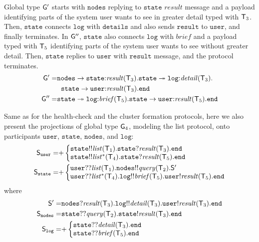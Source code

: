 Global type ${\sf G}'$ starts with $\mathtt{nodes}$ replying to $\mathtt{state}$ $\mathit{result}$ message and a payload identifying parts of the system user wants to see in greater detail typed with ${\mathsf T}_3$. Then, $\mathtt{state}$ connects $\mathtt{log}$ with $\mathtt{details}$ and also sends $\mathtt{result}$ to $\mathtt{user}$, and finally terminates. 
In ${\sf G}''$, $\mathtt{state}$ also connects $\mathtt{log}$ with $\mathit{brief}$ and a payload typed with ${\mathsf T}_5$ identifying parts of the system user wants to see without greater detail. Then, $\mathtt{state}$ replies to $\mathtt{user}$ with $\mathtt{result}$ message, and the protocol terminates.
\begin{align*}
{\sf G}' =  & 
\mathtt{nodes}\to\mathtt{state}{:}\mathit{result}({\mathsf T}_3).\mathtt{state}\twoheadrightarrow \mathtt{log}{:}\mathit{detail}({\mathsf T}_3). \\
& \hspace{2mm}
\mathtt{state}\to\mathtt{user}{:}\mathit{result}({\mathsf T}_3).\mathtt{end}\\
{\sf G}'' = &
\mathtt{state}\twoheadrightarrow \mathtt{log}{:}\mathit{brief}({\mathsf T}_5).\mathtt{state}\to\mathtt{user}{:}\mathit{result}({\mathsf T}_5).\mathtt{end}
\end{align*}

Same as for the health-check and the cluster formation protocols, here we also present the projections of global type ${\sf G}_4$, modeling the list protocol, onto participants $\mathtt{user}$, $\mathtt{state}$, $\mathtt{nodes}$, and $\mathtt{log}$:
\begin{align*}
\ST_\mathtt{user} =& 
{+}
\left\{
\begin{array}{@{}l@{}}  
\mathtt{state}{!!}\mathit{list}(\T_1).\mathtt{state}{?}\mathit{result}(\T_3).\tend \\
\mathtt{state}{!!}\mathit{list^*}(\T_4).\mathtt{state}{?}\mathit{result}(\T_5).\tend 
\end{array} \right. \\
%
%
\ST_\mathtt{state} =&
{+}
\left\{
\begin{array}{@{}l@{}}  
\mathtt{user}{??}\mathit{list}(\T_1).\mathtt{nodes}{!!}\mathit{query}(\T_2).\ST'\\
\mathtt{user}{??}\mathit{list^*}(\T_4).\mathtt{log}{!!}\mathit{brief}(\T_5).\mathtt{user}{!}\mathit{result}(\T_5).\tend
\end{array} \right. 
\end{align*}
where
\begin{align*}
%
\ST'  =& 
\mathtt{nodes}{?}\mathit{result}(\T_3).\mathtt{log}{!!}\mathit{detail}(\T_3).\mathtt{user}{!}\mathit{result}(\T_3).\tend\\
%
%
\ST_\mathtt{nodes} = &
\mathtt{state}{??}\mathit{query}(\T_2).\mathtt{state}{!}\mathit{result}(\T_3).\tend \\
%
%
\ST_\mathtt{log} = & 
{+}
\left\{
\begin{array}{@{}l@{}}  
\mathtt{state}{??}\mathit{detail}(\T_3).\tend \\
\mathtt{state}{??}\mathit{brief}(\T_5).\tend \\
\end{array} \right.
\end{align*}

